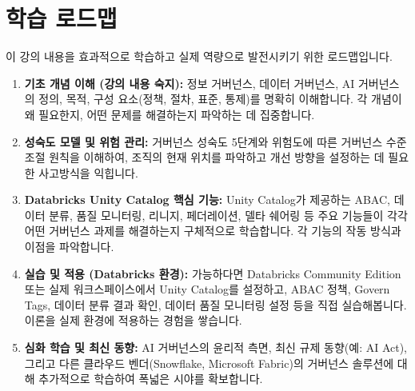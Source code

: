 \documentclass[11pt,a4paper]{article}
\theoremstyle{definition}
\begin{document}
\newpage
\section*{학습 로드맵}

이 강의 내용을 효과적으로 학습하고 실제 역량으로 발전시키기 위한 로드맵입니다.

\begin{enumerate}
    \item \textbf{기초 개념 이해 (강의 내용 숙지):}
    정보 거버넌스, 데이터 거버넌스, AI 거버넌스의 정의, 목적, 구성 요소(정책, 절차, 표준, 통제)를 명확히 이해합니다. 각 개념이 왜 필요한지, 어떤 문제를 해결하는지 파악하는 데 집중합니다.
    \item \textbf{성숙도 모델 및 위험 관리:}
    거버넌스 성숙도 5단계와 위험도에 따른 거버넌스 수준 조절 원칙을 이해하여, 조직의 현재 위치를 파악하고 개선 방향을 설정하는 데 필요한 사고방식을 익힙니다.
    \item \textbf{Databricks Unity Catalog 핵심 기능:}
    Unity Catalog가 제공하는 ABAC, 데이터 분류, 품질 모니터링, 리니지, 페더레이션, 델타 쉐어링 등 주요 기능들이 각각 어떤 거버넌스 과제를 해결하는지 구체적으로 학습합니다. 각 기능의 작동 방식과 이점을 파악합니다.
    \item \textbf{실습 및 적용 (Databricks 환경):}
    가능하다면 Databricks Community Edition 또는 실제 워크스페이스에서 Unity Catalog를 설정하고, ABAC 정책, Govern Tags, 데이터 분류 결과 확인, 데이터 품질 모니터링 설정 등을 직접 실습해봅니다. 이론을 실제 환경에 적용하는 경험을 쌓습니다.
    \item \textbf{심화 학습 및 최신 동향:}
    AI 거버넌스의 윤리적 측면, 최신 규제 동향(예: AI Act), 그리고 다른 클라우드 벤더(Snowflake, Microsoft Fabric)의 거버넌스 솔루션에 대해 추가적으로 학습하여 폭넓은 시야를 확보합니다.
\end{enumerate}
\end{document}
